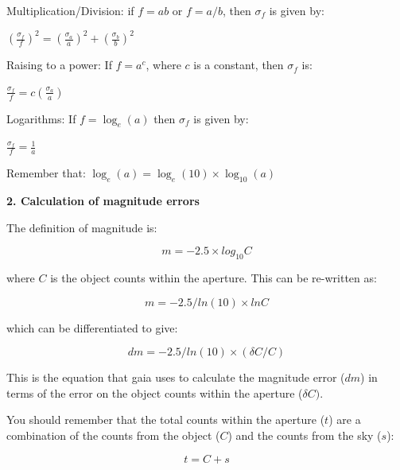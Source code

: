 \documentclass[12pt]{article}
\begin{document}
Multiplication/Division: if $f=ab$ or $f=a/b$, then $\sigma_f$ is
given by:
\begin{center}
\Large{$\left(\frac{\sigma_f}{f}\right)^2 = \left(\frac{\sigma_a}{a}\right)^2 + \left(\frac{\sigma_b}{b}\right)^2$}
\end{center}

\bigskip

Raising to a power: If $f=a^c$, where $c$ is a constant, then
$\sigma_f$ is:
\begin{center}
\Large{$\frac{\sigma_f}{f}=c\left(\frac{\sigma_a}{a}\right)$}
\end{center}

\bigskip

Logarithms: If $f=\log_{e}(a)$ then $\sigma_f$ is given by:
\begin{center}
\Large{$\frac{\sigma_f}{f}=\frac{1}{a}$}
\end{center}
Remember that: $\log_{e}(a)=\log_{e}(10)\times \log_{10}(a)$



\newpage
\begin{center}
{\large{\bf 2. Calculation of magnitude errors}}
\end{center}

The definition of magnitude is:

\begin{equation}
m = -2.5\times log_{10} C
\end{equation}

\noindent
where $C$ is the object counts within the aperture. This can be re-written as:

\begin{equation}
m = -2.5/ln(10) \times ln C
\end{equation}

\noindent
which can be differentiated to give:

\begin{equation}
dm = -2.5/ln(10) \times (\delta C/C)
\end{equation}

\noindent
This is the equation that {\sc gaia} uses to calculate the magnitude
error ($dm$) in terms of the error on the object counts within the
aperture ($\delta C)$.

You should remember that the total counts within the aperture ($t$)
are a combination of the counts from the object ($C$) and the counts from the
sky ($s$):

\begin{equation}
t= C + s 
\end{equation}
\end{document}
